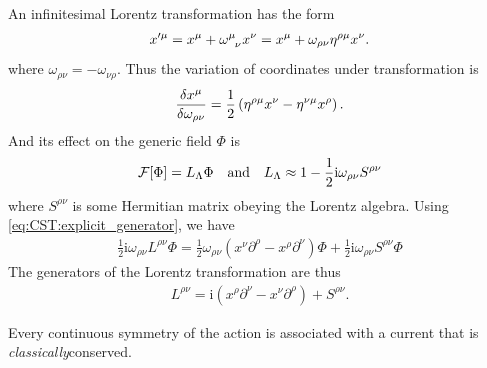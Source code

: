 \documentclass[10pt]{article}
\newcommand{\ii}{\mathrm{i}}
\begin{document}
\begin{example}
    An infinitesimal Lorentz transformation has the form
    \begin{align}
        x'^\mu=x^\mu+\tensor{\omega}{^\mu_\nu}x^\nu=x^\mu+\omega_{\rho\nu}\eta^{\rho\mu}x^\nu.
    \end{align}
    where $\omega_{\rho\nu}=-\omega_{\nu\rho}$.
    Thus the variation of coordinates under transformation is
    \begin{align}
        \fdv{x^\mu}{\omega_{\rho\nu}}=\frac{1}{2}\left(\eta^{\rho\mu}x^\nu-\eta^{\nu\mu}x^\rho\right).\label{eq:CST:lorentz_x}
    \end{align}
    And its effect on the generic field $\Phi$ is
    \begin{align}
        \mathcal{F}[\Phi]=L_\Lambda \Phi\qq{and}L_\Lambda\approx1-\frac{1}{2}\ii\omega_{\rho\nu}S^{\rho\nu}\label{eq:CST:lorentz_phi}
    \end{align}
    where  $S^{\rho\nu}$ is some Hermitian matrix obeying the Lorentz algebra.
    Using \cref{eq:CST:explicit_generator}, we have
    \begin{align}
        \frac{1}{2}\ii\omega_{\rho\nu}L^{\rho\nu}\Phi=\frac{1}{2}\omega_{\rho\nu}\left(x^\nu\partial^\rho-x^\rho\partial^\nu\right)\Phi+\frac{1}{2}\ii\omega_{\rho\nu}S^{\rho\nu}\Phi
    \end{align}
    The generators of the Lorentz transformation are thus
    \begin{align}
        L^{\rho\nu}=\ii\left(x^\rho\partial^{\nu}-x^\nu\partial^\rho\right)+S^{\rho\nu}.\label{eq:CST:Lorentz_operator}
    \end{align}
\end{example}
\begin{theorem}
    Every continuous symmetry of the action is associated with a current that is \textit{classically}\snm conserved.
\end{theorem}
\end{document}
